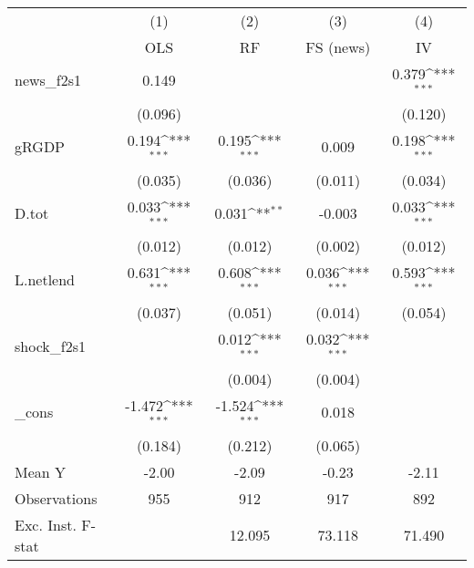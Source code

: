 {
\def\sym#1{\ifmmode^{#1}\else\(^{#1}\)\fi}
\begin{tabular}{l*{4}{c}}
\toprule
            &\multicolumn{1}{c}{(1)}&\multicolumn{1}{c}{(2)}&\multicolumn{1}{c}{(3)}&\multicolumn{1}{c}{(4)}\\
            &\multicolumn{1}{c}{OLS}&\multicolumn{1}{c}{RF}&\multicolumn{1}{c}{FS (news)}&\multicolumn{1}{c}{IV}\\
\midrule
news\_f2s1   &       0.149         &                     &                     &       0.379\sym{***}\\
            &     (0.096)         &                     &                     &     (0.120)         \\
\addlinespace
gRGDP       &       0.194\sym{***}&       0.195\sym{***}&       0.009         &       0.198\sym{***}\\
            &     (0.035)         &     (0.036)         &     (0.011)         &     (0.034)         \\
\addlinespace
D.tot       &       0.033\sym{***}&       0.031\sym{**} &      -0.003         &       0.033\sym{***}\\
            &     (0.012)         &     (0.012)         &     (0.002)         &     (0.012)         \\
\addlinespace
L.netlend   &       0.631\sym{***}&       0.608\sym{***}&       0.036\sym{***}&       0.593\sym{***}\\
            &     (0.037)         &     (0.051)         &     (0.014)         &     (0.054)         \\
\addlinespace
shock\_f2s1  &                     &       0.012\sym{***}&       0.032\sym{***}&                     \\
            &                     &     (0.004)         &     (0.004)         &                     \\
\addlinespace
\_cons      &      -1.472\sym{***}&      -1.524\sym{***}&       0.018         &                     \\
            &     (0.184)         &     (0.212)         &     (0.065)         &                     \\
\midrule
Mean Y      &       -2.00         &       -2.09         &       -0.23         &       -2.11         \\
Observations&         955         &         912         &         917         &         892         \\
Exc. Inst. F-stat&                     &      12.095         &      73.118         &      71.490         \\
\bottomrule
\end{tabular}
}
